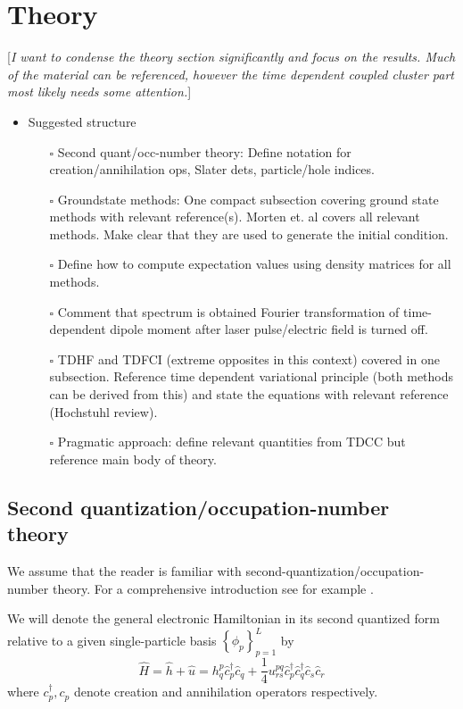 \documentclass[aip,jcp,reprint,floatfix]{revtex4-1}
\newcommand{\oneten}{h}
\newcommand{\twoten}{u}
\newcommand{\onehamil}{\hat{\oneten}}
\newcommand{\twohamil}{\hat{\twoten}}
\newcommand{\brac}[1]{\left\{ #1 \right\}}
\newcommand{\ccr}[1]{\hat{c}_{#1}^{\dagger}}
\newcommand{\can}[1]{\hat{c}_{#1}}
\newcommand \mycomment[1]   {{\color{red} [{\it {#1}}]}}
\newcommand{\todo}{$\square$}
\begin{document}
\section{Theory}
    \mycomment{I want to condense the theory section significantly and focus on the results. Much of the material can be referenced, however the time dependent coupled cluster part most likely needs some attention.}
    \begin{itemize}
        \item Suggested structure
        \begin{itemize}
            \item [\todo] Second quant/occ-number theory: Define notation for creation/annihilation ops, Slater dets, particle/hole indices.
            \item[\todo] Groundstate methods: One compact subsection covering ground state methods with relevant reference(s). Morten et. al \cite{HjorthJensenQD_2017} covers all relevant methods. Make clear that they are used to generate the initial condition. 
            \item [\todo] Define how to compute expectation values using density matrices for all methods.
            \item [\todo] Comment that spectrum is obtained Fourier transformation of time-dependent dipole moment after laser pulse/electric field is turned off.
            \item [\todo] TDHF and TDFCI (extreme opposites in this context) covered in one subsection. Reference time dependent variational principle (both methods can be derived from this) and state the equations with relevant reference (Hochstuhl review).
            \item [\todo] Pragmatic approach: define relevant quantities from TDCC but reference main body of theory.
        \end{itemize}
    \end{itemize}
    
    \subsection{Second quantization/occupation-number theory}
    We assume that the reader is familiar with second-quantization/occupation-number theory. For a comprehensive introduction see for example \cite{szabo1996modern,helgaker2008molecular, shavitt2009many}.
    
    We will denote the general electronic Hamiltonian in its second quantized form relative to a given single-particle basis $\brac{\phi_p}_{p = 1}^{L}$ by
    \begin{equation}
        \hat{H} = \onehamil + \twohamil
        = h^{p}_{q}\ccr{p} \can{q} + \frac{1}{4}u^{pq}_{rs}\ccr{p} \ccr{q} \can{s} \can{r}
    \end{equation}
    where $c_p^{\dagger},c_p$ denote creation and annihilation operators respectively.
    
\end{document}
